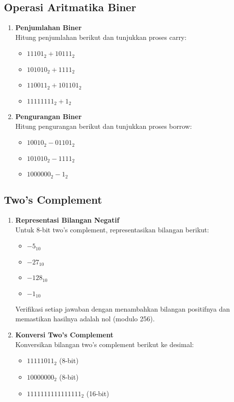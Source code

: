 \documentclass[../main.tex]{subfiles}
\begin{document}
\subsection{Operasi Aritmatika Biner}

\begin{enumerate}
    \item \textbf{Penjumlahan Biner}\\
    Hitung penjumlahan berikut dan tunjukkan proses carry:
    \begin{itemize}
        \item \(11101_2 + 10111_2\)
        \item \(101010_2 + 1111_2\)
        \item \(110011_2 + 101101_2\)
        \item \(11111111_2 + 1_2\)
    \end{itemize}

    \item \textbf{Pengurangan Biner}\\
    Hitung pengurangan berikut dan tunjukkan proses borrow:
    \begin{itemize}
        \item \(10010_2 - 01101_2\)
        \item \(101010_2 - 1111_2\)
        \item \(1000000_2 - 1_2\)
    \end{itemize}
\end{enumerate}

\subsection{Two's Complement}

\begin{enumerate}
    \item \textbf{Representasi Bilangan Negatif}\\
    Untuk 8-bit two's complement, representasikan bilangan berikut:
    \begin{itemize}
        \item \(-5_{10}\)
        \item \(-27_{10}\)
        \item \(-128_{10}\)
        \item \(-1_{10}\)
    \end{itemize}
    
    Verifikasi setiap jawaban dengan menambahkan bilangan positifnya dan memastikan hasilnya adalah nol (modulo 256).

    \item \textbf{Konversi Two's Complement}\\
    Konversikan bilangan two's complement berikut ke desimal:
    \begin{itemize}
        \item \(11111011_2\) (8-bit)
        \item \(10000000_2\) (8-bit)
        \item \(1111111111111111_2\) (16-bit)
    \end{itemize}
\end{enumerate}
\end{document}
